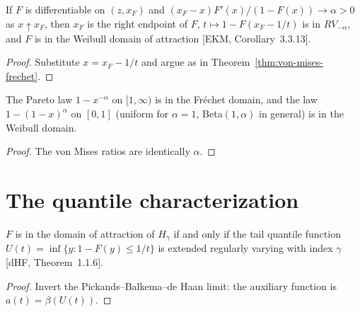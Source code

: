 \begin{theorem}
  \label{thm:von-mises-weibull}
  \leanok
  If $F$ is differentiable on $(z, x_F)$ and $(x_F - x) F'(x)/(1 - F(x)) \to \alpha > 0$ as
  $x \uparrow x_F$, then $x_F$ is the right endpoint of $F$, $t \mapsto 1 - F(x_F - 1/t)$ is in
  $RV_{-\alpha}$, and $F$ is in the Weibull domain of attraction [EKM, Corollary~3.3.13].
\end{theorem}
\begin{proof}
  \leanok
  Substitute $x = x_F - 1/t$ and argue as in Theorem~\ref{thm:von-mises-frechet}.
\end{proof}

\begin{proposition}
  \label{prop:von-mises-examples}
  \leanok
  The Pareto law $1 - x^{-\alpha}$ on $[1, \infty)$ is in the Fr\'echet domain, and the law
  $1 - (1 - x)^\alpha$ on $[0, 1]$ (uniform for $\alpha = 1$, Beta$(1, \alpha)$ in general) is in
  the Weibull domain.
\end{proposition}
\begin{proof}
  \leanok
  The von Mises ratios are identically $\alpha$.
\end{proof}

\section{The quantile characterization}

\begin{theorem}
  \label{thm:mda-quantile}
  \leanok
  $F$ is in the domain of attraction of $H_\gamma$ if and only if the tail quantile function
  $U(t) = \inf\{y : 1 - F(y) \le 1/t\}$ is extended regularly varying with index $\gamma$
  [dHF, Theorem~1.1.6].
\end{theorem}
\begin{proof}
  \leanok
  Invert the Pickands--Balkema--de Haan limit: the auxiliary function is $a(t) = \beta(U(t))$.
\end{proof}

